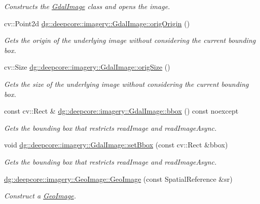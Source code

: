 \begin{DoxyCompactItemize}
\begin{DoxyCompactList}\small\item\em Constructs the \hyperlink{classdg_1_1deepcore_1_1imagery_1_1_gdal_image}{Gdal\+Image} class and opens the image. \end{DoxyCompactList}\item 
cv\+::\+Point2d \hyperlink{group___imagery_module_gac2b4bcd00b506caa4a1d4a08b296e35c}{dg\+::deepcore\+::imagery\+::\+Gdal\+Image\+::orig\+Origin} ()
\begin{DoxyCompactList}\small\item\em Gets the origin of the underlying image without considering the current bounding box. \end{DoxyCompactList}\item 
cv\+::\+Size \hyperlink{group___imagery_module_ga7e8ae8a7ad9fc775b39d358e1cd21647}{dg\+::deepcore\+::imagery\+::\+Gdal\+Image\+::orig\+Size} ()
\begin{DoxyCompactList}\small\item\em Gets the size of the underlying image without considering the current bounding box. \end{DoxyCompactList}\item 
const cv\+::\+Rect \& \hyperlink{group___imagery_module_ga0fb4c1ea48ddb710e97310baddb9f63d}{dg\+::deepcore\+::imagery\+::\+Gdal\+Image\+::bbox} () const noexcept
\begin{DoxyCompactList}\small\item\em Gets the bounding box that restricts read\+Image and read\+Image\+Async. \end{DoxyCompactList}\item 
void \hyperlink{group___imagery_module_ga9391ed841c25ec1391bbb577aa2b81d6}{dg\+::deepcore\+::imagery\+::\+Gdal\+Image\+::set\+Bbox} (const cv\+::\+Rect \&bbox)
\begin{DoxyCompactList}\small\item\em Gets the bounding box that restricts read\+Image and read\+Image\+Async. \end{DoxyCompactList}\item 
\hyperlink{group___imagery_module_ga68f769446764180ec082de155fd2a7af}{dg\+::deepcore\+::imagery\+::\+Geo\+Image\+::\+Geo\+Image} (const Spatial\+Reference \&sr)
\begin{DoxyCompactList}\small\item\em Construct a \hyperlink{classdg_1_1deepcore_1_1imagery_1_1_geo_image}{Geo\+Image}. \end{DoxyCompactList}\item 

\end{DoxyCompactItemize}
